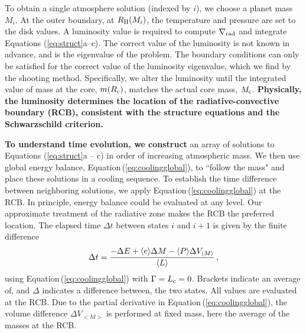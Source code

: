 \documentclass[apj, numberedappendix]{emulateapj}
\newcommand{\brak}[1]{\langle #1\rangle}
\newcommand{\Eq}[1]{Equation\,(\ref{#1})}
\newcommand{\delrad}{\nabla_{\rm rad}}
\newcommand{\RH}{R_{\rm H}}
\newcommand{\co}{_{\rm c}}
\begin{document}

To obtain a single atmosphere solution (indexed by $i$), we choose a planet mass $M_i$.  At the outer boundary, at $\RH(M_i)$, the temperature and pressure are set to the disk values.  A luminosity value is required to compute $\delrad$ and integrate Equations (\ref{eq:struct}a--c).  The correct value of the luminosity is not known in advance, and is the eigenvalue of the problem.  The boundary conditions can only be satisfied for the correct value of the luminosity eigenvalue, which we find by the shooting method.  Specifically, we alter the luminosity until the integrated value of mass at the core, $m(R\co)$, matches the actual core mass, $M\co$. \textbf{Physically, the luminosity determines the location of the radiative-convective boundary (RCB), consistent with the structure equations and the Schwarzschild criterion.}

\textbf{To understand time evolution, we construct} an array of solutions to Equations (\ref{eq:struct}a -- c) in order of increasing atmospheric mass.  We then use global energy balance, \Eq{eq:coolingglobal}, to ``follow the mass" and place these solutions in a cooling sequence.  To establish the time difference between neighboring solutions, we apply \Eq{eq:coolingglobal} at the RCB.  In principle, energy balance could be evaluated at any level.  Our approximate treatment of the radiative zone makes the RCB  the preferred location.     The elapsed time $\Delta t$  between states $i$ and $i +1$ is given by the finite difference
\begin{equation}
\label{eq:dti}
\Delta t = %
{ -\Delta E + \brak{e} \Delta M - \brak{P}  \Delta V_{\brak{M}} \over \brak{L} }\, ,
\end{equation} 
using \Eq{eq:coolingglobal} with $\Gamma = L\co = 0$.
Brackets indicate an average of, and $\Delta$ indicates a difference between, the two states.  All values are evaluated at the RCB.  Due to the partial derivative in \Eq{eq:coolingglobal}, the volume difference $\Delta V_{<M>}$ is performed at fixed mass, here the average of the masses at the RCB.  
\end{document}
